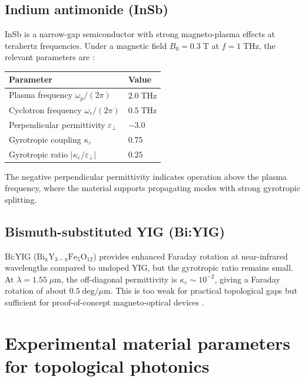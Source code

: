 \subsection{Indium antimonide (InSb)}
\label{sec:appD-insb}

InSb is a narrow-gap semiconductor with strong magneto-plasma effects
at terahertz frequencies.  Under a magnetic field $B_0=0.3\;\mathrm{T}$
at $f=1\;\mathrm{THz}$, the relevant parameters are
\cite{price2022roadmap}:
\begin{center}
\begin{tabular}{ll}
  \toprule
  Parameter & Value \\
  \midrule
  Plasma frequency $\omega_p/(2\pi)$ & $2.0\;\mathrm{THz}$ \\
  Cyclotron frequency $\omega_c/(2\pi)$ & $0.5\;\mathrm{THz}$ \\
  Perpendicular permittivity $\varepsilon_\perp$ & $-3.0$ \\
  Gyrotropic coupling $\kappa_\varepsilon$ & $0.75$ \\
  Gyrotropic ratio $|\kappa_\varepsilon/\varepsilon_\perp|$ & $0.25$ \\
  \bottomrule
\end{tabular}
\end{center}
The negative perpendicular permittivity indicates operation above the
plasma frequency, where the material supports propagating modes with
strong gyrotropic splitting.

\subsection{Bismuth-substituted YIG (Bi:YIG)}
\label{sec:appD-biyig}

Bi:YIG ($\mathrm{Bi_xY_{3-x}Fe_5O_{12}}$) provides enhanced Faraday
rotation at near-infrared wavelengths compared to undoped YIG, but the
gyrotropic ratio remains small.  At $\lambda=1.55\;\mu\mathrm{m}$,
the off-diagonal permittivity is
$\kappa_\varepsilon\sim 10^{-2}$, giving a Faraday rotation of about
$0.5\;\mathrm{deg}/\mu\mathrm{m}$.  This is too weak for practical topological
gaps but sufficient for proof-of-concept magneto-optical devices
\cite{ozawa2018topological}.


\section{Experimental material parameters for topological photonics}
\label{sec:appD-experimental-params}

